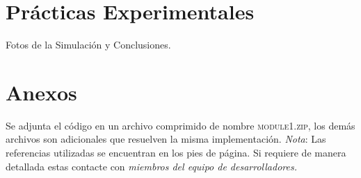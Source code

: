 \documentclass[paper=a4, fontsize=12pt]{article} 		%
\numberwithin{equation}{section}						%
\numberwithin{table}{section} 							%
\begin{document}
\section{Prácticas Experimentales}
Fotos de la Simulación y Conclusiones.
\section{Anexos}
Se adjunta el código en un archivo comprimido de nombre \textsc{module1.zip}, los demás archivos son adicionales que resuelven la misma implementación.
\textit{Nota}: Las referencias utilizadas se encuentran en los pies de página. Si requiere de manera detallada estas contacte con \emph{miembros del equipo de desarrolladores.}
\end{document}

